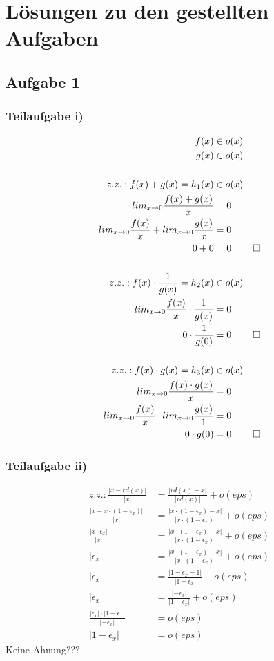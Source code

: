 \documentclass{llncs}
\begin{document}
\chapter*{L\"osungen zu den gestellten Aufgaben}

\section*{Aufgabe 1}

\subsection*{Teilaufgabe i)}

\begin{align*}
f(x) &\in o(x) \\
g(x) &\in o(x) \\
\\
z.z.: f(x) + g(x) = h_1(x) &\in o(x) \\
lim_{x \rightarrow 0} \frac{f(x) + g(x)}{x} &= 0 \\
lim_{x \rightarrow 0} \frac{f(x)}{x} + lim_{x \rightarrow 0} \frac{g(x)}{x} &= 0 \\
0 + 0 &= 0 &\hfill \square \\
\\
z.z.: f(x) \cdot \frac{1}{g(x)} = h_2(x) &\in o(x) \\
lim_{x \rightarrow 0} \frac{f(x)}{x} \cdot \frac{1}{g(x)} &= 0 \\
0 \cdot \frac{1}{g(0)} &= 0 &\hfill \square \\
\\
z.z.: f(x) \cdot g(x) = h_3(x) &\in o(x) \\
lim_{x \rightarrow 0} \frac{f(x) \cdot g(x)}{x} &= 0 \\
lim_{x \rightarrow 0} \frac{f(x)}{x} \cdot lim_{x \rightarrow 0} \frac{g(x)}{1} &= 0 \\
0 \cdot g(0) &= 0 &\hfill \square
\end{align*}

\subsection*{Teilaufgabe ii)}

\begin{align*}
z.z.: \frac{|x-rd(x)|}{|x|} &= \frac{|rd(x) - x|}{|rd(x)|} + o(eps) \\
\frac{|x-x \cdot (1-\epsilon_x)|}{|x|} &= \frac{|x \cdot (1-\epsilon_x) - x|}{|x \cdot (1-\epsilon_x)|} + o(eps) \\
\frac{|x \cdot \epsilon_x|}{|x|} &= \frac{|x \cdot (1-\epsilon_x) - x|}{|x \cdot (1-\epsilon_x)|} + o(eps) \\
|\epsilon_x| &= \frac{|x \cdot (1-\epsilon_x) - x|}{|x \cdot (1-\epsilon_x)|} + o(eps) \\
|\epsilon_x| &= \frac{|1-\epsilon_x - 1|}{|1-\epsilon_x|} + o(eps) \\
|\epsilon_x| &= \frac{|-\epsilon_x|}{|1-\epsilon_x|} + o(eps) \\
\frac{|\epsilon_x| \cdot |1-\epsilon_x|}{|-\epsilon_x|} &= o(eps) \\
|1-\epsilon_x| &= o(eps)
\end{align*}
Keine Ahnung???
\end{document}
